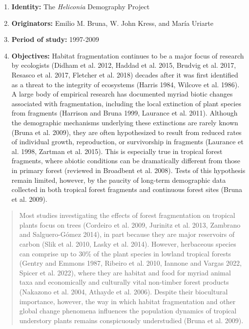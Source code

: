 \documentclass[
  12pt,
  man, donotrepeattitle]{apa6}
\begin{document}
\begin{enumerate}
\def\labelenumi{\arabic{enumi}.}
\item
  \textbf{Identity:} The \emph{Heliconia} Demography Project
\item
  \textbf{Originators:} Emilio M. Bruna, W. John Kress, and María Uriarte
\item
  \textbf{Period of study:} 1997-2009
\item
  \textbf{Objectives:} Habitat fragmentation continues to be a major focus of research by ecologists (Didham et al. 2012, Haddad et al. 2015, Brudvig et al. 2017, Resasco et al. 2017, Fletcher et al. 2018) decades after it was first identified as a threat to the integrity of ecosystems (Harris 1984, Wilcove et al. 1986). A large body of empirical research has documented myriad biotic changes associated with fragmentation, including the local extinction of plant species from fragments (Harrison and Bruna 1999, Laurance et al. 2011). Although the demographic mechanisms underlying these extinctions are rarely known (Bruna et al. 2009), they are often hypothesized to result from reduced rates of individual growth, reproduction, or survivorship in fragments (Laurance et al. 1998, Zartman et al. 2015). This is especially true in tropical forest fragments, where abiotic conditions can be dramatically different from those in primary forest (reviewed in Broadbent et al. 2008). Tests of this hypothesis remain limited, however, by the paucity of long-term demographic data collected in both tropical forest fragments and continuous forest sites (Bruna et al. 2009).
\end{enumerate}

\begin{quote}
Most studies investigating the effects of forest fragmentation on tropical plants focus on trees (Cordeiro et al. 2009, Jurinitz et al. 2013, Zambrano and Salguero-Gómez 2014), in part because they are major reservoirs of carbon (Slik et al. 2010, Lasky et al. 2014). However, herbaceous species can comprise up to 30\% of the plant species in lowland tropical forests (Gentry and Emmons 1987, Ribeiro et al. 2010, Iannone and Vargas 2022, Spicer et al. 2022), where they are habitat and food for myriad animal taxa and economically and culturally vital non-timber forest products (Nakazono et al. 2004, Athayde et al. 2006). Despite their biocultural importance, however, the way in which habitat fragmentation and other global change phenomena influences the population dynamics of tropical understory plants remains conspicuously understudied (Bruna et al. 2009).
\end{quote}
\end{document}
